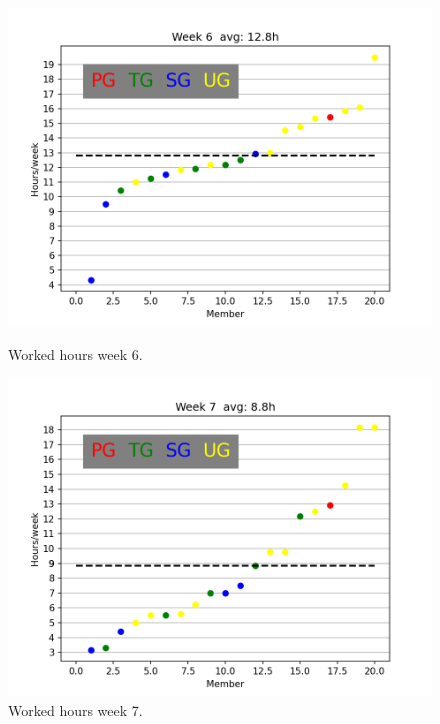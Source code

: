 \documentclass{article}
\begin{document}
        \begin{figure}[!htb]
            \endminipage\hfill
              \includegraphics[width=\linewidth]{images/week_6.png}
              \caption{Worked hours week 6.}\label{fig:week6}
            \endminipage\hfill
              \includegraphics[width=\linewidth]{images/week_7.png}
              \caption{Worked hours week 7.}\label{fig:week7}
            \endminipage\hfill
            \endminipage\hfill
        \end{figure}
        
\end{document}
